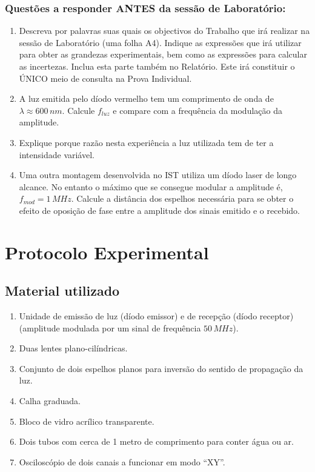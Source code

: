 \documentclass[a4paper,12pt]{article}      %
\begin{document}
\subsubsection{\sf Questões a responder ANTES da sessão de Laboratório:}
\begin{enumerate}
\item Descreva por palavras suas quais os objectivos do Trabalho que irá realizar na sessão de Laboratório (uma folha A4). Indique as expressões que irá utilizar para obter as grandezas experimentais, bem como as expressões para calcular as incertezas. Inclua esta parte também no Relatório. Este irá constituir o ÚNICO meio de consulta na Prova Individual.
\item A luz emitida pelo díodo vermelho tem um comprimento de onda de $\lambda \approx 600 \, nm$. Calcule $f_{luz}$ e compare com a frequência da modulação da amplitude.
\item Explique porque razão nesta experiência a luz utilizada  tem de ter a intensidade variável.
\item Uma outra montagem desenvolvida no IST utiliza um díodo laser de longo alcance. No entanto o máximo que se consegue modular a amplitude é, $f_{mod}=1\, MHz$. Calcule a distância
dos espelhos necessária para se obter o efeito de oposição de fase entre a amplitude dos sinais emitido e o recebido.
\end{enumerate}

\newpage
\section{\sf Protocolo Experimental}
\subsection{\sf Material utilizado}

\begin{enumerate}
\setlength{\itemsep}{0mm}
\item Unidade de emissão de luz (díodo emissor) e de recepção (díodo receptor)
(amplitude modulada por um sinal de frequência $50\,MHz$).
\item Duas lentes plano-cilíndricas.
\item Conjunto de dois espelhos planos para inversão do sentido de propagação da luz.
\item Calha graduada.  
\item Bloco de vidro acrílico transparente.
\item Dois tubos com cerca de 1 metro de comprimento para conter água ou ar. 
\item Osciloscópio de dois canais a funcionar em modo “XY”.
\end{enumerate}
\end{document}

